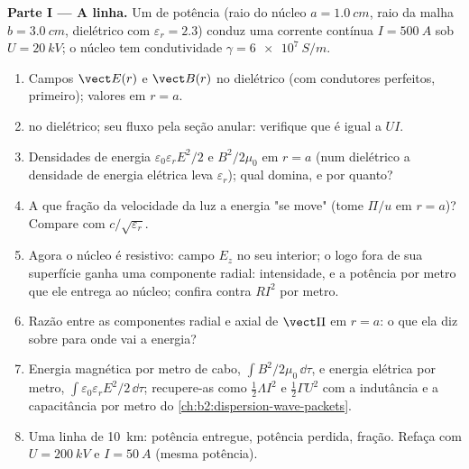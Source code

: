\begin{problem}
\label{pb:b2:poynting-vector:1}

\medskip
\noindent\textbf{Parte I --- A linha.}
Um  de potência (raio do núcleo $a = \qty{1.0}{cm}$, raio da malha $b =
\qty{3.0}{cm}$, dielétrico com $\varepsilon_r = 2.3$) conduz uma corrente contínua $I =
\qty{500}{A}$ sob $U = \qty{20}{kV}$; o núcleo tem condutividade $\gamma =
\qty{6e7}{S/m}$.
\begin{enumerate}
  \item Campos $\vect E(r)$ e $\vect B(r)$ no dielétrico (com condutores
        perfeitos, primeiro); valores em $r = a$.
  \item {} no dielétrico; seu fluxo pela
        seção anular: verifique que é igual a $UI$.
  \item Densidades de energia $\varepsilon_0\varepsilon_rE^2/2$ e $B^2/2\mu_0$ em $r = a$
        (num dielétrico a densidade de energia elétrica leva $\varepsilon_r$);
        qual domina, e por quanto?
  \item A que fração da velocidade da luz a energia "se move"
        (tome $\Pi/u$ em $r = a$)? Compare com $c/\sqrt{\varepsilon_r}$.
  \item Agora o núcleo é resistivo: campo $E_z$ no seu interior; o
         logo fora de sua superfície ganha uma componente
        radial: intensidade, e a potência por metro que ele entrega ao
        núcleo; confira contra $RI^2$ por metro.
  \item Razão entre as componentes radial e axial de $\vect\Pi$ em $r =
        a$: o que ela diz sobre para onde vai a energia?
  \item Energia magnética por metro de cabo, $\int B^2/2\mu_0\,\dd\tau$, e
        energia elétrica por metro, $\int\varepsilon_0\varepsilon_rE^2/2\,\dd\tau$;
        recupere-as como $\tfrac12\Lambda I^2$ e $\tfrac12\Gamma U^2$ com a
        indutância e a capacitância por metro do \cref{ch:b2:dispersion-wave-packets}.
  \item Uma linha de \qty{10}{km}: potência entregue, potência perdida, fração.
        Refaça com $U = \qty{200}{kV}$ e $I = \qty{50}{A}$ (mesma potência).
\end{enumerate}


\end{problem}
